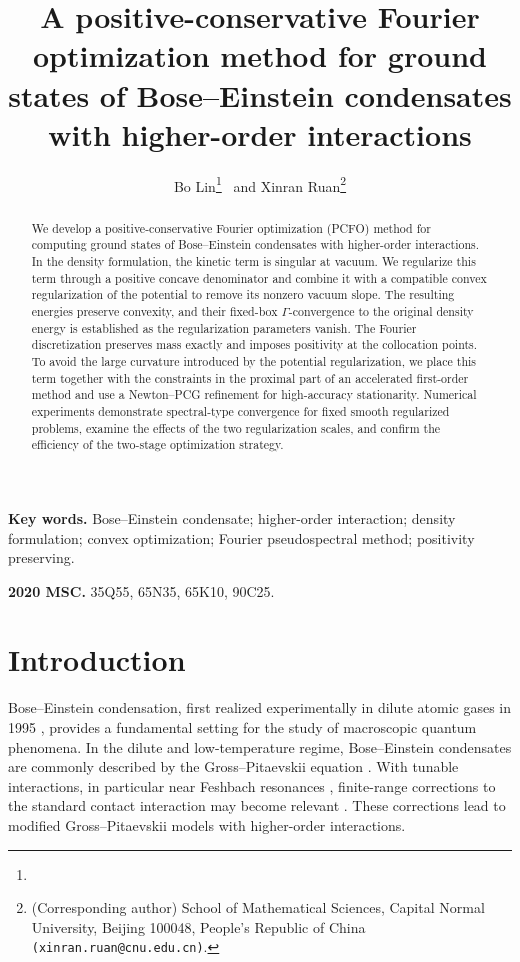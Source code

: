 \documentclass[11pt]{article}
\title{\bf
A positive-conservative Fourier optimization method for ground states of Bose--Einstein condensates with higher-order interactions
}
\author{
Bo Lin\thanks{} \,  and 
Xinran Ruan\thanks{(Corresponding author) School of Mathematical Sciences, Capital Normal University, Beijing 100048, People's Republic of China {\tt (xinran.ruan@cnu.edu.cn)}.}
}
\date{}
\theoremstyle{plain}
\theoremstyle{definition}
\numberwithin{equation}{section}
\begin{document}
\maketitle

\begin{abstract}
We develop a positive-conservative Fourier optimization (PCFO) method for computing ground
states of Bose--Einstein condensates with higher-order interactions.
In the density formulation, the kinetic term is singular at vacuum.
We regularize this term through a positive concave denominator and
combine it with a compatible convex regularization of the potential to remove
its nonzero vacuum slope. The resulting energies preserve convexity,
and their fixed-box $\Gamma$-convergence to the original density energy is
established as the regularization parameters vanish. The Fourier
discretization preserves mass exactly and imposes positivity at the
collocation points.  
To avoid the large curvature introduced by the potential regularization, we
place this term together with the constraints in the proximal part of
an accelerated first-order method and use a Newton--PCG refinement for
high-accuracy stationarity. Numerical experiments demonstrate
spectral-type convergence for fixed smooth regularized problems,
examine the effects of the two regularization scales, and confirm the
efficiency of the two-stage optimization strategy.
\end{abstract}

\noindent
\textbf{Key words.}
Bose--Einstein condensate; higher-order interaction; density
formulation; convex optimization; Fourier
pseudospectral method; positivity preserving. 

\medskip

\noindent
\textbf{2020 MSC.}
35Q55, 65N35, 65K10, 90C25.


\section{Introduction}

Bose--Einstein condensation, first realized experimentally in dilute
atomic gases in 1995 \cite{Anderson1995}, provides a fundamental
setting for the study of macroscopic quantum phenomena. In the dilute
and low-temperature regime, Bose--Einstein condensates are commonly
described by the Gross--Pitaevskii equation \cite{BaoCaiReview}. With
tunable interactions, in particular near Feshbach resonances
\cite{Chin2010}, finite-range corrections to the standard contact
interaction may become relevant
\cite{FuWangGao2003,CollinMassignanPethick2007,
ZinnerThogersen2009,VekslerFishmanKetterle2014}. These corrections lead
to modified Gross--Pitaevskii models with higher-order interactions.
\end{document}
